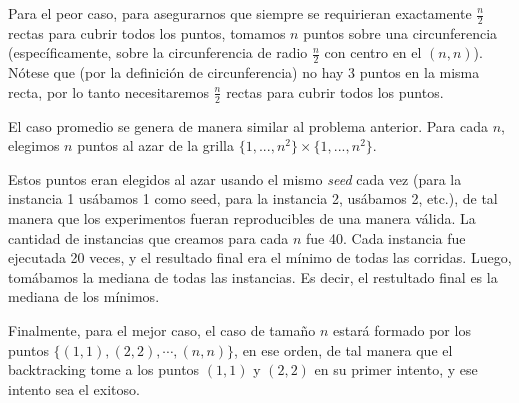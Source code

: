 Para el peor caso, para asegurarnos que siempre se requirieran exactamente $\frac{n}{2}$ rectas para cubrir todos los puntos, tomamos $n$ puntos sobre una circunferencia (específicamente, sobre la circunferencia de radio $\frac{n}{2}$ con centro en el $(n,n)$). Nótese que (por la definición de circunferencia) no hay 3 puntos en la misma recta, por lo tanto necesitaremos $\frac{n}{2}$ rectas para cubrir todos los puntos.

El caso promedio se genera de manera similar al problema anterior. Para cada $n$, elegimos $n$ puntos al azar de la grilla $\{1,..., n^2\} \times \{1, ... , n^2\}$.

Estos puntos eran elegidos al azar usando el mismo \emph{seed} cada vez (para la instancia 1 usábamos 1 como seed, para la instancia 2, usábamos 2, etc.), de tal manera que los experimentos fueran reproducibles de una manera válida.
La cantidad de instancias que creamos para cada $n$ fue 40.
Cada instancia fue ejecutada 20 veces, y el resultado final era el mínimo de todas las corridas.
Luego, tomábamos la mediana de todas las instancias. Es decir, el restultado final es la mediana de los mínimos.

Finalmente, para el mejor caso, el caso de tamaño $n$ estará formado por los puntos $\{(1,1), (2,2), \cdots, (n, n)\}$, en ese orden, de tal manera que el backtracking tome a los puntos $(1,1)$ y $(2,2)$ en su primer intento, y ese intento sea el exitoso.
